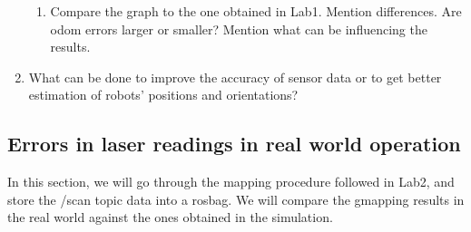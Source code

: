 \documentclass[12pt]{article}
\begin{document}
\begin{enumerate}
\begin{enumerate}
        \item Compare the graph to the one obtained in Lab1. Mention differences. Are odom errors larger or smaller? Mention what can be influencing the results.
    
    \end{enumerate}

    \item What can be done to improve the accuracy of sensor data or to get better estimation of robots' positions and orientations?
    


\end{enumerate}


\subsection{Errors in laser readings in real world operation}
In this section, we will go through the mapping procedure followed in Lab2, and store the /scan topic data into a rosbag. We will compare the gmapping results in the real world against the ones obtained in the simulation.
\end{document}
